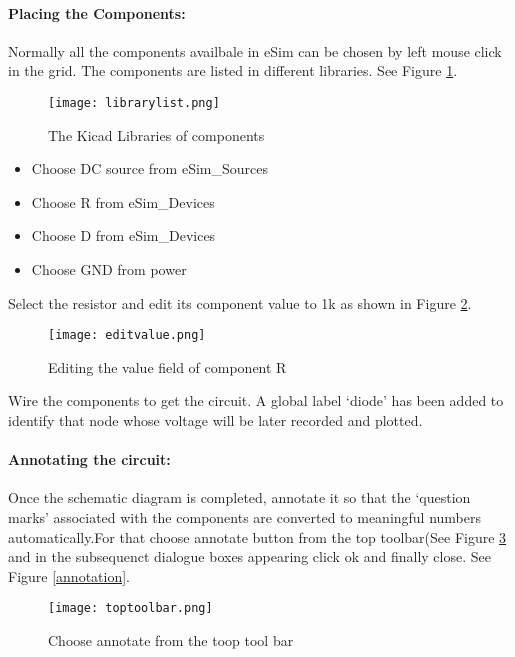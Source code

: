 \paragraph{Placing the Components:} Normally all the components availbale in eSim can be chosen by left mouse click in the grid. The components are listed in different libraries. See Figure \ref{librarylist}.

\begin{figure}[h]
\centering
\texttt{[image: librarylist.png]}
\caption{The Kicad Libraries of components}
\label{librarylist}
\end{figure}

\begin{itemize}
\item
Choose DC source from eSim\_Sources
\item
Choose R from eSim\_Devices
\item
Choose D from eSim\_Devices
\item
Choose GND from power
\end{itemize}

Select the resistor and edit its component value to 1k as shown in Figure \ref{editvalue}.

\begin{figure}[h]
\centering
\texttt{[image: editvalue.png]}
\caption{Editing the value field of component R}
\label{editvalue}
\end{figure}

Wire the components to get the circuit. A global label `diode' has been added to identify that node whose voltage will be later recorded and plotted.

\paragraph{Annotating the circuit:} Once the schematic diagram is completed, annotate it so that the `question marks' associated with the components are converted to meaningful numbers automatically.For that choose annotate button from the top toolbar(See Figure \ref{toptoolbar} and in the subsequenct dialogue boxes appearing click ok and finally close. See Figure \ref{annotation}.

\begin{figure}[h]
\centering
\texttt{[image: toptoolbar.png]}
\caption{Choose annotate from the toop tool bar}
\label{toptoolbar}
\end{figure}



